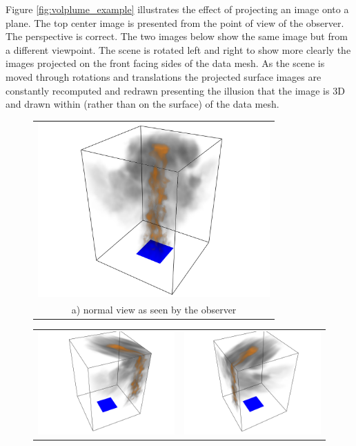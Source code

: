 {Figure \ref{fig:volplume_example} illustrates the effect of
projecting an image onto a plane.  The top center image is
presented from the point of view of the observer.  The perspective
is correct.  The two images below show the same image but from a
different viewpoint.  The scene is rotated left and right to show
more clearly the images projected on the front facing sides of the
data mesh.  As the scene is moved through rotations and
translations the projected surface images are constantly
recomputed and redrawn presenting the illusion that the image is
3D and drawn within (rather than on the surface) of the data mesh.


\begin{figure}[\figoptions]
\begin{center}
\begin{tabular}{c}
\includegraphics[width=3.5in]{FIGURES/vis_test2_nonfreeze}\\
a) normal view as seen by the observer
\end{tabular}
\begin{tabular}{cc}
\includegraphics[width=3.5in]{FIGURES/vis_test2_freezeC}&
\includegraphics[width=3.5in]{FIGURES/vis_test2_freezeA}\\

\end{tabular}
\end{center}
\end{figure}}
